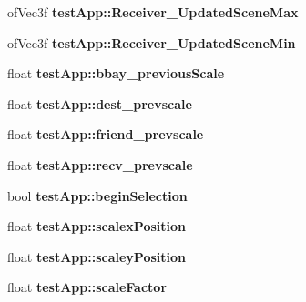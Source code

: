 \begin{DoxyCompactItemize}
\item 
\hypertarget{group___int_variables_gad33d38a0db010bd1b74cc4f502f529c4}{of\-Vec3f {\bfseries test\-App\-::\-Receiver\-\_\-\-Updated\-Scene\-Max}}\label{group___int_variables_gad33d38a0db010bd1b74cc4f502f529c4}

\item 
\hypertarget{group___int_variables_ga0a554e4ca59fcaf9d18b6d63b68943b2}{of\-Vec3f {\bfseries test\-App\-::\-Receiver\-\_\-\-Updated\-Scene\-Min}}\label{group___int_variables_ga0a554e4ca59fcaf9d18b6d63b68943b2}

\item 
\hypertarget{group___int_variables_gadda5f987b9b136333f02915b03f18e56}{float {\bfseries test\-App\-::bbay\-\_\-previous\-Scale}}\label{group___int_variables_gadda5f987b9b136333f02915b03f18e56}

\item 
\hypertarget{group___int_variables_gaac8001bec46df76d8eccbb6b66f69288}{float {\bfseries test\-App\-::dest\-\_\-prevscale}}\label{group___int_variables_gaac8001bec46df76d8eccbb6b66f69288}

\item 
\hypertarget{group___int_variables_gaf25705e69cb6c7cdd12b616a2999d11e}{float {\bfseries test\-App\-::friend\-\_\-prevscale}}\label{group___int_variables_gaf25705e69cb6c7cdd12b616a2999d11e}

\item 
\hypertarget{group___int_variables_ga7740fc10aee18669cfa23ddd4e81beac}{float {\bfseries test\-App\-::recv\-\_\-prevscale}}\label{group___int_variables_ga7740fc10aee18669cfa23ddd4e81beac}

\item 
\hypertarget{group___int_variables_gaa2d09c9954dc56b2aaacc99d05948885}{bool {\bfseries test\-App\-::begin\-Selection}}\label{group___int_variables_gaa2d09c9954dc56b2aaacc99d05948885}

\item 
\hypertarget{group___int_variables_gafea17ef4df91c9cd446cd99f9b8e2ddb}{float {\bfseries test\-App\-::scalex\-Position}}\label{group___int_variables_gafea17ef4df91c9cd446cd99f9b8e2ddb}

\item 
\hypertarget{group___int_variables_ga9e86476934494e86dd955d5888333795}{float {\bfseries test\-App\-::scaley\-Position}}\label{group___int_variables_ga9e86476934494e86dd955d5888333795}

\item 
\hypertarget{group___int_variables_ga862943de1cd06690befd3740f6711762}{float {\bfseries test\-App\-::scale\-Factor}}\label{group___int_variables_ga862943de1cd06690befd3740f6711762}


\end{DoxyCompactItemize}
